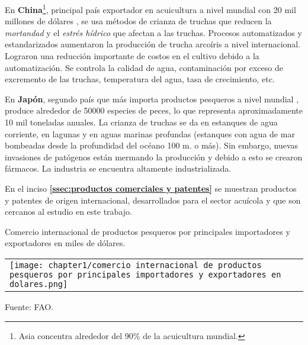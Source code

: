 En \textbf{China}\footnote{Asia concentra alrededor del 90\% de la acuicultura mundial.\citep{Powell2003}}, principal país exportador en acuicultura a nivel mundial con 20 mil millones de dólares \citep[p.~44]{FAO2017}, se usa métodos de crianza de truchas que reducen la \textit{mortandad} y el \textit{estrés hídrico} que afectan a las truchas. Procesos automatizados y estandarizados aumentaron la producción de trucha arcoíris a nivel internacional. Lograron una reducción importante de costos en el cultivo debido a la automatización. Se controla la calidad de agua, contaminación por exceso de excremento de las truchas, temperatura del agua, tasa de crecimiento, etc. \citep[p.~1-6]{2017}

En \textbf{Japón}, segundo país que más importa productos pesqueros a nivel mundial \citep[p.~44]{FAO2017}, produce alrededor de 50000 especies de peces, lo que representa aproximadamente 10 mil toneladas anuales. La crianza de truchas se da en estanques de agua corriente, en lagunas y en aguas marinas profundas (estanques con agua de mar bombeadas desde la profundidad del océano 100 m. o más). Sin embargo, nuevas invasiones de patógenos están mermando la producción y debido a esto se crearon fármacos. La industria se encuentra altamente industrializada. \citep[p.~1-5]{2005} 

En el inciso \textbf{\ref{ssec:productos comerciales y patentes}} se muestran productos y patentes de origen internacional, desarrollados para el sector acuícola y que son cercanos al estudio en este trabajo.

\begin{mytable}[H]
	\footnotesize\centering	
	\caption{Comercio internacional de productos pesqueros por principales importadores y exportadores en miles de dólares.}
	\label{tbl:comercio internacional de productos pesqueros por principales importadores y exportadores en dolares}
	\begin{tabular}{ l }
		\begin{minipage}{1\textwidth}
			\texttt{[image: chapter1/comercio internacional de productos pesqueros por principales importadores y exportadores en dolares.png]}
		\end{minipage}	
	\end{tabular}
	\begin{myflushcenteraftertable}
		Fuente: FAO.
	\end{myflushcenteraftertable}	
\end{mytable}

